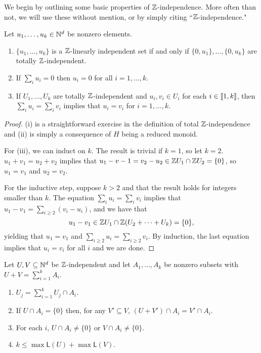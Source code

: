 We begin by outlining some basic properties of $\mathbb{Z}$-independence.  
More often than not, we will use these without mention, or by simply citing ``$\mathbb{Z}$-independence."
\begin{prop} \label{prop:eltwise-indep}
Let $u_1,\dots, u_k\in \mathbb{N}^d$ be nonzero elements.
\begin{enumerate}[label={\rm (\roman{*})}]
	\item $\{u_1,\dots,u_k\}$ is a $\mathbb{Z}$-linearly independent set if and only if $\{0,u_1\},\dots,\{0,u_k\}$ are totally $\mathbb{Z}$-independent.
	
	\item If $\sum_i u_i = 0$ then $u_i = 0$ for all $i=1,\dots, k$.
	
	\item If $U_1,\dots, U_k$ are totally $\mathbb{Z}$-independent and $u_i, v_i\in U_i$ for each $i\in \llbracket 1,k \rrbracket$,
	then $\sum_i u_i = \sum_i v_i$ implies that $u_i = v_i$ for $i = 1,\dots, k$.
\end{enumerate}
\end{prop}

\begin{proof}
(i) is a straightforward exercise in the definition of total $\mathbb{Z}$-independence and (ii) is simply a consequence of $H$ being a reduced monoid.

For (iii), we can induct on $k$.
The result is trivial if $k = 1$, so let $k=2$.
$u_1 + v_1 = u_2 + v_2$ implies that $u_1 - v-1 = v_2 - u_2 \in \mathbb{Z} U_1 \cap \mathbb{Z} U_2 = \{0\}$, so $u_1 = v_1$ and $u_2 = v_2$.

For the inductive step, suppose $k>2$ and that the result holds for integers smaller than $k$.
The equation $\sum_i u_i = \sum_i v_i$ implies that $u_1 - v_1 = \sum_{i\ge 2} (v_i - u_i)$, and we have that 
\[u_1 - v_1 \in \mathbb{Z} U_1 \cap \mathbb{Z}(U_2+\cdots+U_k) = \{0\},\]
yielding that $u_1 = v_1$ and $\sum_{i\ge 2} u_i = \sum_{i\ge 2} v_i$.
By induction, the last equation implies that $u_i = v_i$ for all $i$ and we are done.
\end{proof}

\begin{prop} \label{prop:indep-decomp}
Let $U,V \subseteq \mathbb{N}^d$ be $\mathbb{Z}$-independent and let $A_1,\dots, A_k$ be nonzero subsets with $U+V = \sum_{i=1}^k A_i$.
\begin{enumerate}[label={\rm (\roman{*})}]
	\item $U_j = \sum_{i=1}^k U_j\cap A_i$.
	\item If $U \cap A_i = \{0\}$ then, for any $V'\subseteq V$, $(U+V')\cap A_i = V'\cap A_i$.
	\item For each $i$, $U\cap A_i \neq \{0\}$ or $V \cap A_i \neq \{0\}$.
	\item $k \le \max \mathsf{L}(U) + \max \mathsf{L}(V)$.
\end{enumerate}
\end{prop}

